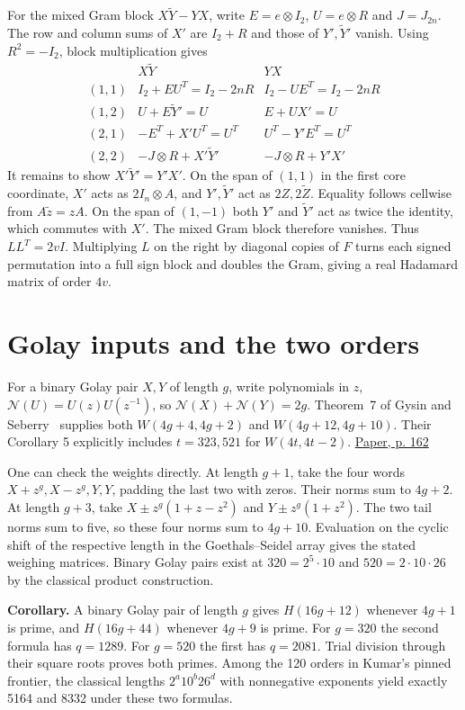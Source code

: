 \documentclass[10pt]{article}
\begin{document}
For the mixed Gram block $X\widetilde Y-YX$, write $E=e\otimes I_2$, $U=e\otimes R$ and $J=J_{2n}$. The row and column sums of $X'$ are $I_2+R$ and those of $Y',\widetilde Y'$ vanish. Using $R^2=-I_2$, block multiplication gives
\[
\begin{array}{c|cc}
 &X\widetilde Y& YX\\ \hline
(1,1)&I_2+EU^T=I_2-2nR&I_2-UE^T=I_2-2nR\\
(1,2)&U+E\widetilde Y'=U&E+UX'=U\\
(2,1)&-E^T+X'U^T=U^T&U^T-Y'E^T=U^T\\
(2,2)&-J\otimes R+X'\widetilde Y'&-J\otimes R+Y'X'
\end{array}
\]
It remains to show $X'\widetilde Y'=Y'X'$. On the span of $(1,1)$ in the first core coordinate, $X'$ acts as $2I_n\otimes A$, and $Y',\widetilde Y'$ act as $2Z,2\widetilde Z$. Equality follows cellwise from $A\widetilde z=zA$. On the span of $(1,-1)$ both $Y'$ and $\widetilde Y'$ act as twice the identity, which commutes with $X'$. The mixed Gram block therefore vanishes. Thus $LL^T=2vI$. Multiplying $L$ on the right by diagonal copies of $F$ turns each signed permutation into a full sign block and doubles the Gram, giving a real Hadamard matrix of order $4v$.

\section{Golay inputs and the two orders}

For a binary Golay pair $X,Y$ of length $g$, write polynomials in $z$, $\mathcal N(U)=U(z)U(z^{-1})$, so $\mathcal N(X)+\mathcal N(Y)=2g$. Theorem~7 of Gysin and Seberry~\cite{gs} supplies both $W(4g+4,4g+2)$ and $W(4g+12,4g+10)$. Their Corollary 5 explicitly includes $t=323,521$ for $W(4t,4t-2)$. \href{https://ajc.maths.uq.edu.au/pdf/12/ocr-ajc-v12-p157.pdf#page=6}{Paper, p. 162}

One can check the weights directly. At length $g+1$, take the four words $X+z^g,X-z^g,Y,Y$, padding the last two with zeros. Their norms sum to $4g+2$. At length $g+3$, take $X\pm z^g(1+z-z^2)$ and $Y\pm z^g(1+z^2)$. The two tail norms sum to five, so these four norms sum to $4g+10$. Evaluation on the cyclic shift of the respective length in the Goethals–Seidel array gives the stated weighing matrices. Binary Golay pairs exist at $320=2^5\cdot10$ and $520=2\cdot10\cdot26$ by the classical product construction.

\noindent\textbf{Corollary.} A binary Golay pair of length $g$ gives $H(16g+12)$ whenever $4g+1$ is prime, and $H(16g+44)$ whenever $4g+9$ is prime. For $g=320$ the second formula has $q=1289$. For $g=520$ the first has $q=2081$. Trial division through their square roots proves both primes. Among the 120 orders in Kumar's pinned frontier, the classical lengths $2^a10^b26^d$ with nonnegative exponents yield exactly 5164 and 8332 under these two formulas.
\end{document}
